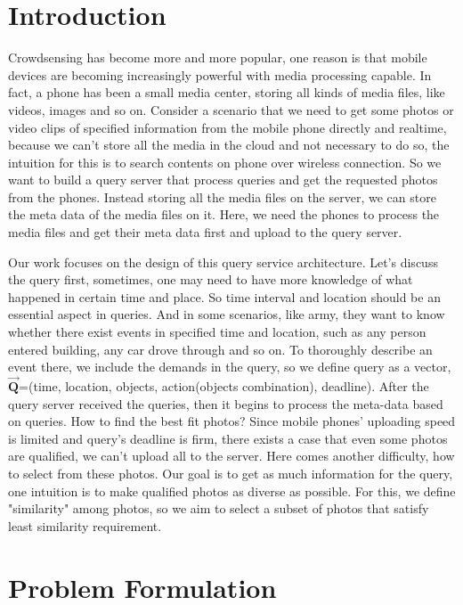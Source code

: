 \section{Introduction}
\label{sec:intro}

Crowdsensing has become more and more popular, one reason is that mobile devices are becoming increasingly powerful with media processing capable. In fact, a phone has been a small media center, storing all kinds of media files, like videos, images and so on. Consider a scenario that we need to get some photos or video clips of specified information from the mobile phone directly and realtime, because we can't store all the media in the cloud and not necessary to do so, the intuition for this is to search contents on phone over wireless connection. So we want to build a query server that process queries and get the requested photos from the phones. Instead storing all the media files on the server, we can store the meta data of the media files on it. Here, we need the phones to process the media files and get their meta data first and upload to the query server.

Our work focuses on the design of this query service architecture. Let's discuss the query first, sometimes, one may need to have more knowledge of what happened in certain time and place. So time interval and location should be an essential aspect in queries. And in some scenarios, like army, they want to know whether there exist events in specified time and location, such as any person entered building, any car drove through and so on. To thoroughly describe an event there, we include the demands in the query, so we define query as a vector, $\overrightarrow{\mathbf{Q}}$=(time, location, objects, action(objects combination), deadline). After the query server received the queries, then it begins to process the meta-data based on queries. How to find the best fit photos? Since mobile phones' uploading speed is limited and query's deadline is firm, there exists a case that even some photos are qualified, we can't upload all to the server. Here comes another difficulty, how to select from these photos. Our goal is to get as much information for the query, one intuition is to make qualified photos as diverse as possible. For this, we define "similarity" among photos, so we aim to select a subset of photos that satisfy least similarity requirement.

\section{Problem Formulation}
\label{sec:probl}



